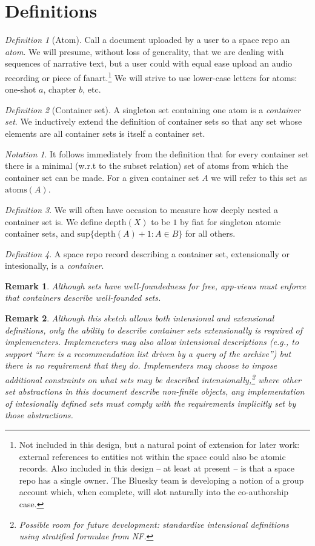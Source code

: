 \documentclass{amsart}
\newtheorem{rem}{Remark}
\theoremstyle{remark}
\newtheorem{defn}{Definition}
\newtheorem{notn}{Notation}
\begin{document}
\section{Definitions}
\begin{defn}[Atom]Call a document uploaded by a user to a space repo an \emph{atom}. We will presume, without loss of generality, that we are dealing with sequences of narrative text, but a user could with equal ease upload an audio recording or piece of fanart.\footnote{Not included in this design, but a natural point of extension for later work: external references to entities not within the space could also be atomic records. Also included in this design -- at least at present -- is that a space repo has a single owner. The Bluesky team is developing a notion of a group account which, when complete, will slot naturally into the co-authorship case.} We will strive to use lower-case letters for atoms: one-shot $a$, chapter $b$, etc.\end{defn}
\begin{defn}[Container set]A singleton set containing one atom is a \emph{container set}. We inductively extend the definition of container sets so that any set whose elements are all container sets is itself a container set.\end{defn}
\begin{notn}It follows immediately from the definition that for every container set there is a minimal (w.r.t to the subset relation) set of atoms from which the container set can be made. For a given container set $A$ we will refer to this set as $\mathrm{atoms}(A)$.\end{notn}
\begin{defn}We will often have occasion to measure how deeply nested a container set is. We define $\mathrm{depth}(X)$ to be $1$ by fiat for singleton atomic container sets, and $\mathrm{sup}\{\mathrm{depth}(A)+1 : A\in B\}$ for all others.\end{defn}
\begin{defn}A space repo record describing a container set, extensionally or intesionally, is a \emph{container}.\end{defn}
\begin{rem}Although sets have well-foundedness for free, app-views must enforce that containers describe well-founded sets.\end{rem}
\begin{rem}Although this sketch allows both intensional and extensional definitions, only the ability to describe container sets extensionally is required of implemeneters. Implemeneters \emph{may} also allow intensional descriptions (e.g., to support ``here is a recommendation list driven by a query of the archive'') but there is no requirement that they do. Implementers may choose to impose additional constraints on what sets may be described intensionally,\footnote{Possible room for future development: standardize intensional definitions using stratified formulae from NF.} where other set abstractions in this document describe non-finite objects, any implementation of intesionally defined sets must comply with the requirements implicitly set by those abstractions.\end{rem}
\end{document}
